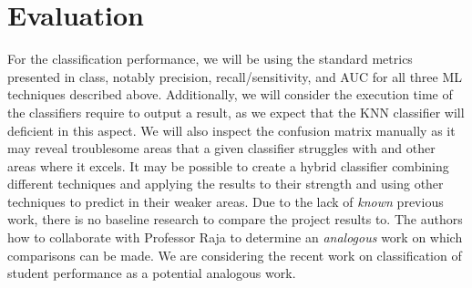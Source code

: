 \documentclass[12pt]{diazessay}
\begin{document}
\section*{Evaluation}

For the classification performance, we will be using the standard metrics presented in class, notably precision, recall/sensitivity, and AUC for all three ML techniques described above.
Additionally, we will consider the execution time of the classifiers require to output a result, as we expect that the KNN classifier will deficient in this aspect.
We will also inspect the confusion matrix manually as it may reveal troublesome areas that a given classifier struggles with and other areas where it excels.
It may be possible to create a hybrid classifier combining different techniques and applying the results to their strength and using other techniques to predict in their weaker areas.
Due to the lack of \emph{known} previous work, there is no baseline research to compare the project results to.
The authors how to collaborate with Professor Raja to determine an \emph{analogous} work on which comparisons can be made.
We are considering the recent work on classification of student performance \cite{muchuchuti2019classification} as a potential analogous work.


\clearpage



\end{document}
